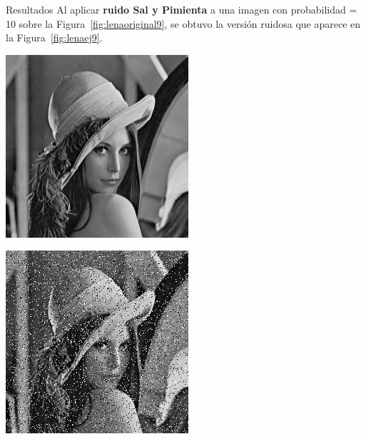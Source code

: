 \documentclass{beamer}
\begin{document}
\begin{frame}[fragile]{Resultados}
	\justifying
	Al aplicar \textcolor{unahurverde}{\textbf{ruido Sal y Pimienta}} a una imagen con probabilidad = 10 sobre la Figura~\ref{fig:lenaoriginal9},  
	se obtuvo la versión ruidosa que aparece en la Figura~\ref{fig:lenaej9}.
	\vspace{0.5cm}
	
	\centering
	\begin{minipage}{0.45\linewidth}
		\centering
		\includegraphics[width=\linewidth]{../results/lena_original}
		\label{fig:lenaoriginal9}
	\end{minipage}\hfill
	\begin{minipage}{0.45\linewidth}
		\centering
		\includegraphics[width=\linewidth]{../results/lena_ej9}

\end{minipage}
\end{frame}
\end{document}
